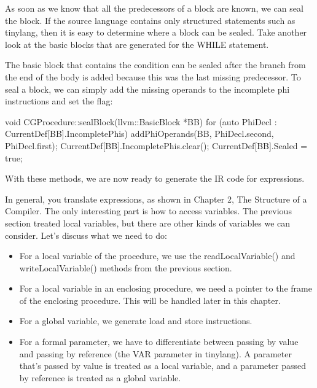 
As soon as we know that all the predecessors of a block are known, we can seal the block. If the source language contains only structured statements such as tinylang, then it is easy to determine where a block can be sealed. Take another look at the basic blocks that are generated for the WHILE statement.

The basic block that contains the condition can be sealed after the branch from the end of the body is added because this was the last missing predecessor. To seal a block, we can simply add the missing operands to the incomplete phi instructions and set the flag:

\begin{cpp}
void CGProcedure::sealBlock(llvm::BasicBlock *BB) {
    for (auto PhiDecl : CurrentDef[BB].IncompletePhis) {
        addPhiOperands(BB, PhiDecl.second, PhiDecl.first);
    }
    CurrentDef[BB].IncompletePhis.clear();
    CurrentDef[BB].Sealed = true;
}
\end{cpp}

With these methods, we are now ready to generate the IR code for expressions.


In general, you translate expressions, as shown in Chapter 2, The Structure of a Compiler. The only interesting part is how to access variables. The previous section treated local variables, but there are other kinds of variables we can consider. Let’s discuss what we need to do:

\begin{itemize}
\item
For a local variable of the procedure, we use the readLocalVariable() and writeLocalVariable() methods from the previous section.

\item
For a local variable in an enclosing procedure, we need a pointer to the frame of the enclosing procedure. This will be handled later in this chapter.

\item
For a global variable, we generate load and store instructions.

\item
For a formal parameter, we have to differentiate between passing by value and passing by reference (the VAR parameter in tinylang). A parameter that’s passed by value is treated as a local variable, and a parameter passed by reference is treated as a global variable.
\end{itemize}

